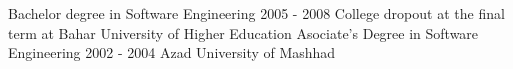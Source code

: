 \documentclass[12pt]{developercv}
\begin{document}

\begin{entrylist}
	\entry
		{}
		{Bachelor degree in Software Engineering}
		{2005 - 2008}
		{College dropout at the final term at Bahar University of Higher Education}
	\entry
		{}
		{Asociate's Degree in Software Engineering}
		{2002 - 2004}
		{Azad University of Mashhad}
\end{entrylist}


%
%
%	
%	
%	
%	
%

\end{document}
